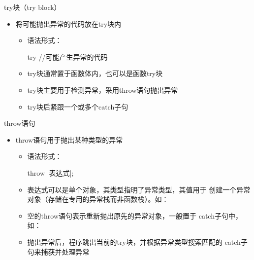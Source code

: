 \begin{frame}[t, fragile]{try块（try block）}%
  \begin{itemize}
  \item 将可能抛出异常的代码放在try块内
    \begin{itemize}
    \item 语法形式：\\
      \begin{cpptt}
        try
        {
          //可能产生异常的代码
        }
      \end{cpptt}
    \item try块通常置于函数体内，也可以是\alert{函数try块}
    \item try块主要用于检测异常，采用throw语句抛出异常
    \item try块后紧跟一个或多个catch子句
    \end{itemize}
  \end{itemize}
\end{frame}


\begin{frame}[t, fragile]{throw语句}%
  \begin{itemize}
  \item throw语句用于抛出某种类型的异常
    \begin{itemize}
    \item 语法形式：\\
      \begin{cpptt}
        throw |表达式|;
      \end{cpptt}
    \item 表达式可以是单个对象，其类型指明了\alert{异常类型}，其值用于
      创建一个\alert{异常对象}（存储在专用的异常栈而非函数栈）。如：
    \item 空的throw语句表示\alert{重新抛出}原先的异常对象，一般置于
      catch子句中，如：
    \item 抛出异常后，程序跳出当前的try块，并根据异常类型搜索匹配的
      catch子句来捕获并处理异常
    \end{itemize}
  \end{itemize}
\end{frame}

